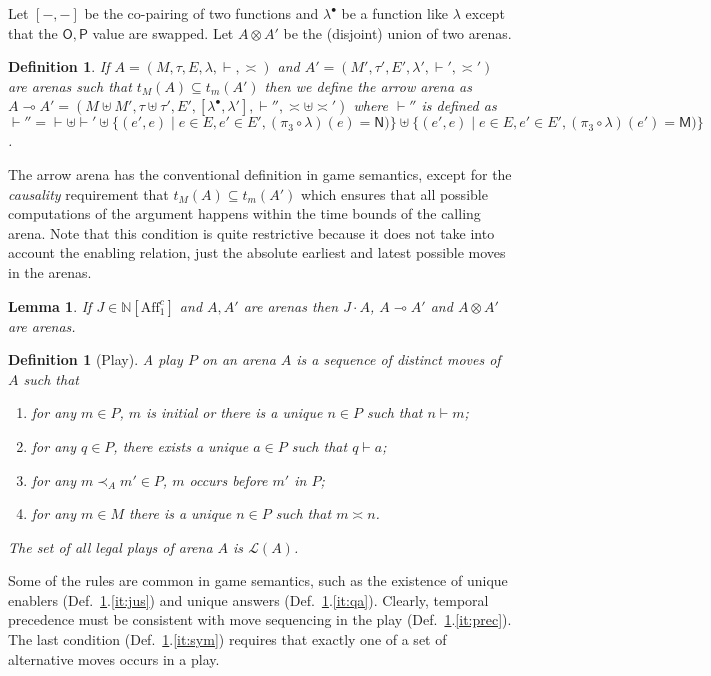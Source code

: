 \documentclass{article}
\newcommand{\aff}{\mathrm{Aff}_1^c}
\newtheorem{definition}[theorem]{Definition}
\newtheorem{lemma}[theorem]{Lemma}
\newcommand{\mv}[1]{\mathsf{#1}}
\begin{document}
Let $[-,-]$ be the co-pairing of two functions and $\lambda^\bullet$ be a function like $\lambda$ except that the $\mv O, \mv P$ value are swapped. Let $A\otimes A'$ be the (disjoint) union of two arenas. 
\begin{definition}
If $A=(M,\tau,E,\lambda,\vdash,{\asymp})$ and $A'=(M',\tau',E',\lambda',\vdash',{\asymp'})$ are arenas such that $t_M(A)\subseteq t_m(A')$ then we define the \emph{arrow} arena as $A\multimap A'=(M\uplus M',\tau\uplus \tau',E',[\lambda^\bullet,\lambda'],{\vdash''},{\asymp}\uplus{\asymp'})$ where $\vdash''$ is defined as ${\vdash''}={\vdash}\uplus{\vdash'}\uplus\{(e',e)\mid e\in E, e'\in E', (\pi_3\circ \lambda)(e)=\mv N)\}\uplus\{(e',e)\mid e\in E, e'\in E', (\pi_3\circ \lambda)(e')=\mv M)\}$.
\end{definition}
The arrow arena has the conventional definition in game semantics, except for the \emph{causality} requirement that $t_M(A)\subseteq t_m(A')$ which ensures that all possible computations of the argument happens within the time bounds of the calling arena. Note that this condition is quite restrictive because it does not take into account the enabling relation, just the absolute earliest and latest possible moves in the arenas.
\begin{lemma}
If $J\in\mathbb N[\aff]$ and $A, A'$ are arenas then $J\cdot A$, $A\multimap A'$ and $A\otimes A'$ are arenas. 
\end{lemma}

\begin{definition}[Play]\label{def:play}
A play $P$ on an arena $A$ is a sequence of \emph{distinct} moves of $A$ such that 
\begin{enumerate}
\item\label{it:jus} for any $m\in P$, $m$ is initial or there is a unique $n\in P$ such that $n\vdash m$;
\item\label{it:qa}  for any $q\in P$, there exists a unique $a\in P$ such that $q\vdash a$;
\item\label{it:prec}  for any $m\prec_A m' \in P$, $m$ occurs before $m'$ in $P$;
\item\label{it:sym}  
for any  $m\in M$ there is a unique $n\in P$ such that $m\asymp n$. 
\end{enumerate}
The set of all legal plays of arena $A$ is $\mathcal L(A)$. 
\end{definition}
Some of the rules are common in game semantics, such as the existence of unique enablers (Def.~\ref{def:play}.\ref{it:jus}) and unique answers (Def.~\ref{def:play}.\ref{it:qa}). Clearly, temporal precedence must be consistent with move sequencing in the play (Def.~\ref{def:play}.\ref{it:prec}). The last condition (Def.~\ref{def:play}.\ref{it:sym}) requires that exactly one of a set of alternative moves occurs in a play. 
\end{document}
